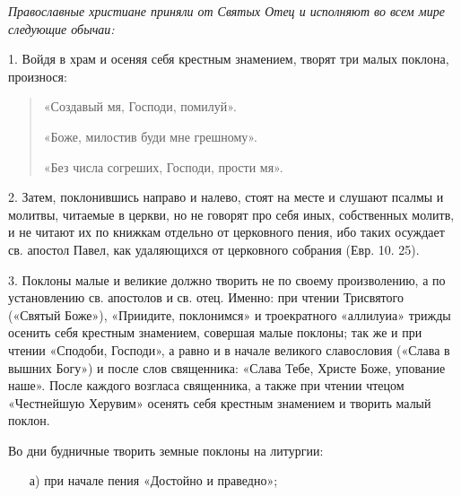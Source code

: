 

\label{_o-molitve}

 

 
\begin{mymulticols}

\emph{ Православные христиане приняли от Святых Отец и исполняют во всем мире следующие обычаи: }



1. Войдя в храм и осеняя себя крестным знамением, творят три малых поклона, произнося:

\begin{quote}{

«Создавый мя, Господи, помилуй». 

«Боже, милостив буди мне грешному». 

«Без числа согреших, Господи, прости мя».

}
\end{quote}


2. Затем, поклонившись направо и налево, стоят на месте и слушают псалмы и молитвы, читаемые в церкви, но не говорят про себя иных, собственных молитв, и не читают их по книжкам отдельно от церковного пения, ибо таких осуждает св. апостол Павел, как удаляющихся от церковного собрания (Евр. 10. 25). 



3. Поклоны малые и великие должно творить не по своему произволению, а по установлению св. апостолов и св. отец. Именно: при чтении Трисвятого («Святый Боже»), «Приидите, поклонимся» и троекратного «аллилуиа» трижды осенить себя крестным знамением, совершая малые поклоны; так же и при чтении «Сподоби, Господи», а равно и в начале великого славословия («Слава в вышних Богу») и после слов священника: «Слава Тебе, Христе Боже, упование наше». После каждого возгласа священника, а также при чтении чтецом «Честнейшую Херувим» осенять себя крестным знамением и творить малый поклон. 



Во дни будничные творить земные поклоны на литургии:


\begin{enumerate}

\item[а)] при начале пения «Достойно и праведно»; 


\end{enumerate}
\end{mymulticols}
